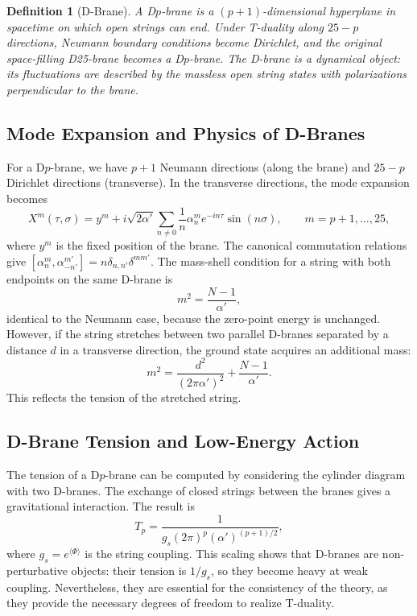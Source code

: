 \documentclass[11pt]{article}
\newtheorem{definition}{Definition}
\begin{document}
\begin{definition}[D-Brane]
A D$p$-brane is a $(p+1)$-dimensional hyperplane in spacetime on which open strings can end. Under T-duality along $25-p$ directions, Neumann boundary conditions become Dirichlet, and the original space-filling D25-brane becomes a D$p$-brane. The D-brane is a dynamical object: its fluctuations are described by the massless open string states with polarizations perpendicular to the brane.
\end{definition}

\subsection{Mode Expansion and Physics of D-Branes}

For a D$p$-brane, we have $p+1$ Neumann directions (along the brane) and $25-p$ Dirichlet directions (transverse). In the transverse directions, the mode expansion becomes
\begin{equation}
X^m(\tau,\sigma) = y^m + i\sqrt{2\alpha'} \sum_{n\neq0} \frac{1}{n} \alpha_n^m e^{-in\tau} \sin(n\sigma), \qquad m=p+1,\dots,25,
\end{equation}
where $y^m$ is the fixed position of the brane. The canonical commutation relations give $[\alpha_n^m, \alpha_{-n'}^{m'}] = n \delta_{n,n'} \delta^{mm'}$. The mass-shell condition for a string with both endpoints on the same D-brane is
\begin{equation}
m^2 = \frac{N-1}{\alpha'},
\end{equation}
identical to the Neumann case, because the zero-point energy is unchanged. However, if the string stretches between two parallel D-branes separated by a distance $d$ in a transverse direction, the ground state acquires an additional mass:
\begin{equation}
m^2 = \frac{d^2}{(2\pi\alpha')^2} + \frac{N-1}{\alpha'}.
\end{equation}
This reflects the tension of the stretched string.

\subsection{D-Brane Tension and Low-Energy Action}

The tension of a D$p$-brane can be computed by considering the cylinder diagram with two D-branes. The exchange of closed strings between the branes gives a gravitational interaction. The result is
\begin{equation}
T_p = \frac{1}{g_s (2\pi)^p (\alpha')^{(p+1)/2}},
\end{equation}
where $g_s = e^{\langle \Phi \rangle}$ is the string coupling. This scaling shows that D-branes are non-perturbative objects: their tension is $1/g_s$, so they become heavy at weak coupling. Nevertheless, they are essential for the consistency of the theory, as they provide the necessary degrees of freedom to realize T-duality.
\end{document}
